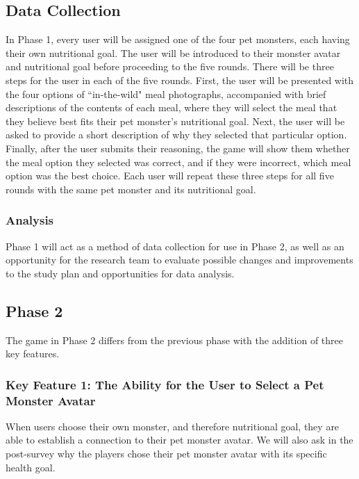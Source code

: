 \subsection{Data Collection}

In Phase 1, every user will be assigned one of the four pet monsters, each having their own nutritional goal. 
The user will be introduced to their monster avatar and nutritional goal before proceeding to the five rounds. 
There will be three steps for the user in each of the five rounds. 
First, the user will be presented with the four options of ``in-the-wild" meal photographs, accompanied with brief descriptions of the contents of each meal, where they will select the meal that they believe best fits their pet monster’s nutritional goal. 
Next, the user will be asked to provide a short description of why they selected that particular option. 
Finally, after the user submits their reasoning, the game will show them whether the meal option they selected was correct, and if they were incorrect, which meal option was the best choice. 
Each user will repeat these three steps for all five rounds with the same pet monster and its nutritional goal. 

\subsubsection{Analysis}

Phase 1 will act as a method of data collection for use in Phase 2, as well as an opportunity for the research team to evaluate possible changes and improvements to the study plan and opportunities for data analysis.

\subsection{Phase 2}

The game in Phase 2 differs from the previous phase with the addition of three key features.

\subsubsection*{Key Feature 1: The Ability for the User to Select a Pet Monster Avatar}
When users choose their own monster, and therefore nutritional goal, they are able to establish a connection to their pet monster avatar. We will also ask in the post-survey why the players chose their pet monster avatar with its specific health goal.  

